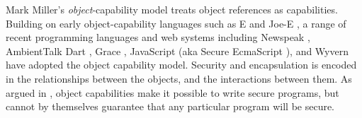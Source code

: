 Mark Miller's \cite{MillerPhD}
\textit{object}-capability model treats
object references
as capabilities. 
Building on early object-capability languages such as E
\cite{MillerPhD,ELang} and Joe-E \cite{JoeE}, 
a range of recent programming languages and web systems
\cite{CapJavaHayesAPLAS17,CapNetSocc17Eide,DOCaT14} including Newspeak
\cite{newspeak17},
AmbientTalk \cite{ambientTalk}
Dart \cite{dart15}, Grace \cite{grace,graceClasses},
JavaScript (aka Secure EcmaScript \cite{miller-esop2013}),
and Wyvern \cite{wyverncapabilities} have adopted the object
capability model.
Security  and encapsulation 
is encoded in the relationships between the objects, and the interactions between them.
 As argued in  \cite{capeFTfJP}, %
 object capabilities
 make it possible to write secure
  programs,
  but cannot by themselves guarantee that any particular program
  will be secure.
%


